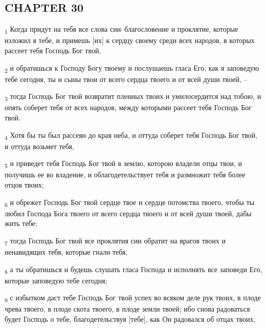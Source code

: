 \subsection{CHAPTER 30}
\begin{tcolorbox}
\textsubscript{1} Когда придут на тебя все слова сии--благословение и проклятие, которые изложил я тебе, и примешь [их] к сердцу своему среди всех народов, в которых рассеет тебя Господь Бог твой,
\end{tcolorbox}
\begin{tcolorbox}
\textsubscript{2} и обратишься к Господу Богу твоему и послушаешь гласа Его, как я заповедую тебе сегодня, ты и сыны твои от всего сердца твоего и от всей души твоей, --
\end{tcolorbox}
\begin{tcolorbox}
\textsubscript{3} тогда Господь Бог твой возвратит пленных твоих и умилосердится над тобою, и опять соберет тебя от всех народов, между которыми рассеет тебя Господь Бог твой.
\end{tcolorbox}
\begin{tcolorbox}
\textsubscript{4} Хотя бы ты был рассеян до края неба, и оттуда соберет тебя Господь Бог твой, и оттуда возьмет тебя,
\end{tcolorbox}
\begin{tcolorbox}
\textsubscript{5} и приведет тебя Господь Бог твой в землю, которою владели отцы твои, и получишь ее во владение, и облагодетельствует тебя и размножит тебя более отцов твоих;
\end{tcolorbox}
\begin{tcolorbox}
\textsubscript{6} и обрежет Господь Бог твой сердце твое и сердце потомства твоего, чтобы ты любил Господа Бога твоего от всего сердца твоего и от всей души твоей, дабы жить тебе;
\end{tcolorbox}
\begin{tcolorbox}
\textsubscript{7} тогда Господь Бог твой все проклятия сии обратит на врагов твоих и ненавидящих тебя, которые гнали тебя,
\end{tcolorbox}
\begin{tcolorbox}
\textsubscript{8} а ты обратишься и будешь слушать гласа Господа и исполнять все заповеди Его, которые заповедую тебе сегодня;
\end{tcolorbox}
\begin{tcolorbox}
\textsubscript{9} с избытком даст тебе Господь Бог твой успех во всяком деле рук твоих, в плоде чрева твоего, в плоде скота твоего, в плоде земли твоей; ибо снова радоваться будет Господь о тебе, благодетельствуя [тебе], как Он радовался об отцах твоих,
\end{tcolorbox}
